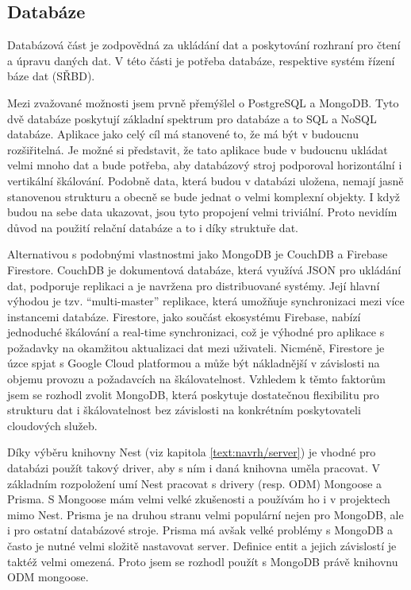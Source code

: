 \subsection{Databáze}\label{text:navrh/databaze}

Databázová část je zodpovědná za ukládání dat a poskytování rozhraní pro čtení a úpravu daných dat. 
V této části je potřeba databáze, respektive systém řízení báze dat (SŘBD).

Mezi zvažované možnosti jsem prvně přemýšlel o PostgreSQL a MongoDB.
Tyto dvě databáze poskytují základní spektrum pro databáze a to SQL a NoSQL databáze. 
Aplikace jako celý cíl má stanovené to, že má být v budoucnu rozšiřitelná.
Je možné si představit, že tato aplikace bude v budoucnu ukládat velmi mnoho dat a bude potřeba, aby databázový stroj podporoval horizontální i vertikální škálování.
Podobně data, která budou v databázi uložena, nemají jasně stanovenou strukturu a obecně se bude jednat o velmi komplexní objekty.
I když budou na sebe data ukazovat, jsou tyto propojení velmi triviální.
Proto nevidím důvod na použití relační databáze a to i díky struktuře dat.

Alternativou s podobnými vlastnostmi jako MongoDB je CouchDB a Firebase Firestore. 
CouchDB je dokumentová databáze, která využívá JSON pro ukládání dat, podporuje replikaci a je navržena pro distribuované systémy. 
Její hlavní výhodou je tzv. \enquote{multi-master} replikace, která umožňuje synchronizaci mezi více instancemi databáze. 
Firestore, jako součást ekosystému Firebase, nabízí jednoduché škálování a real-time synchronizaci, což je výhodné pro aplikace s požadavky na okamžitou aktualizaci dat mezi uživateli. 
Nicméně, Firestore je úzce spjat s Google Cloud platformou a může být nákladnější v závislosti na objemu provozu a požadavcích na škálovatelnost. 
Vzhledem k těmto faktorům jsem se rozhodl zvolit MongoDB, která poskytuje dostatečnou flexibilitu pro strukturu dat i škálovatelnost bez závislosti na konkrétním poskytovateli cloudových služeb.

Díky výběru knihovny Nest (viz kapitola \ref{text:navrh/server}) je vhodné pro databázi použít takový driver, aby s ním i daná knihovna uměla pracovat.
V základním rozpoložení umí Nest pracovat s drivery (resp. ODM) Mongoose a Prisma.
S Mongoose mám velmi velké zkušenosti a používám ho i v projektech mimo Nest.
Prisma je na druhou stranu velmi populární nejen pro MongoDB, ale i pro ostatní databázové stroje.
Prisma má avšak velké problémy s MongoDB a často je nutné velmi složitě nastavovat server.
Definice entit a jejich závislostí je taktéž velmi omezená.
Proto jsem se rozhodl použít s MongoDB právě knihovnu ODM mongoose.

